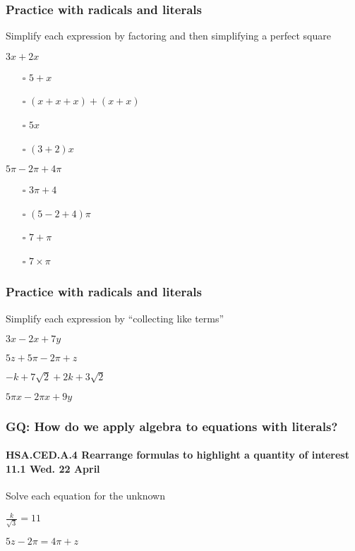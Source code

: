 \documentclass{beamer}
\begin{document}
\frame
{
  \frametitle{Practice with radicals and literals}

  Simplify each expression by factoring and then simplifying a perfect square
  
  \begin{enumerate}
    \begin{multicols}{2}
      \item $3x+2x$
      \begin{itemize}
        \item[$\square$] $5+x$
        \item[$\square$] $(x+x+x)+(x+x)$
        \item[$\square$] $5x$
        \item[$\square$] $(3+2)x$
      \end{itemize}
      \item $5\pi-2\pi+4\pi$
      \begin{itemize}
        \item[$\square$] $3\pi+4$
        \item[$\square$] $(5-2+4)\pi$
        \item[$\square$] $7+\pi$
        \item[$\square$] $7 \times \pi$
      \end{itemize}
    \end{multicols}
    \end{enumerate} \vspace{5cm}
}

\frame
{
  \frametitle{Practice with radicals and literals}

  Simplify each expression by ``collecting like terms''
\Large{  
  \begin{enumerate}%
    \begin{multicols}{2}
      \item $3x-2x+7y$ \vspace{2cm}
      \item $5z+5\pi-2\pi+z$
      \item $-k+7\sqrt{2}+2k+3\sqrt{2}$ \vspace{2cm}
      \item $5\pi x-2 \pi x +9y$
    \end{multicols}
    \end{enumerate} \vspace{2cm}
}}


\frame
{
  \frametitle{GQ: How do we apply algebra to equations with literals?}
  \framesubtitle{HSA.CED.A.4 Rearrange formulas to highlight a quantity of interest \hfill \alert{11.1 Wed. 22 April}}
  \Large{
  Solve each equation for the unknown
  
  \begin{enumerate}
    \begin{multicols}{2}
      \item $\displaystyle \frac{k}{\sqrt{3}}=11$
      \item $5z-2 \pi = 4\pi +z$
    \end{multicols}
    \end{enumerate} \vspace{7cm}
}}
\end{document}
